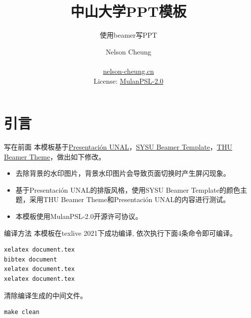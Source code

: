 \documentclass{libs/format}
\title[sysu ppt template]{中山大学PPT模板}
\subtitle{使用beamer写PPT}
\institute[Sun Yat-Sen University]{
  计算机学院 \\ 
  中山大学}
\date[\ctoday]{\ctoday}
\begin{document}


\author[Nelson Cheung]{
  Nelson Cheung \\\medskip
  {} \\
  {\url{nelson-cheung.cn}} \\
  {\small{License: \href{https://license.coscl.org.cn/MulanPSL2/}{MulanPSL-2.0}}}
}

\begin{frame}
  \titlepage
\end{frame}
\setcounter{framenumber}{0}

\begin{frame}
  \tableofcontents[sectionstyle=show,subsectionstyle=show/shaded/hide,subsubsectionstyle=show/shaded/hide]
  \addtocounter{framenumber}{-1}
\end{frame}



\section{引言}

\begin{frame}{写在前面}
  本模板基于\href{https://www.overleaf.com/latex/templates/presentacion-unal/nzfkbkgnctfp}{Presentación UNAL}，\href{https://github.com/yxnchen/sysu-beamer-template}{SYSU Beamer Template}，\href{https://www.overleaf.com/latex/templates/thu-beamer-theme/vwnqmzndvwyb}{THU Beamer Theme}，做出如下修改。
  \begin{itemize}
    \item 去除背景的水印图片，背景水印图片会导致页面切换时产生屏闪现象。
    \item 基于Presentación UNAL的排版风格，使用SYSU Beamer Template的颜色主题，采用THU Beamer Theme和Presentación UNAL的内容进行测试。
    \item 本模板使用MulanPSL-2.0开源许可协议。
  \end{itemize}
\end{frame}

\begin{frame}[fragile]{编译方法}
  本模板在texlive 2021下成功编译, 依次执行下面4条命令即可编译。
  \begin{lstlisting}
xelatex document.tex
bibtex document
xelatex document.tex
xelatex document.tex\end{lstlisting}
  清除编译生成的中间文件。
  \begin{lstlisting}
make clean\end{lstlisting}  

\end{frame}
\end{document}
